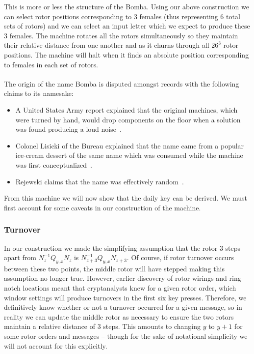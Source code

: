 \noindent This is more or less the structure of the Bomba. Using our
above construction we can select rotor positions corresponding to 3
females (thus representing 6 total sets of rotors) and we can select
an input letter which we expect to produce these 3 females. The
machine rotates all the rotors simultaneously so they maintain their
relative distance from one another and as it churns through all
$26^3$ rotor positions. The machine will halt when it finds an
absolute position corresponding to females in each set of rotors.
\\\\The
origin of the name Bomba is disputed amongst records with the
following claims to its namesake:
\begin{itemize}
  \item A United States Army report explained that the original
    machines, which were turned by hand, would drop components on the
    floor when a solution was found producing a loud noise~\cite[p.~10]{usBombeReport1944}.
  \item Colonel Lisicki of the Bureau explained that
    the name came from a popular ice-cream dessert of the same name
    which was consumed while the machine was first conceptualized~\cite[p.~63]{KozaczukEnigma1984}.
  \item Rejewski claims that the name was effectively random~\cite[p.~226]{Rejewski1981}.
\end{itemize}
From this machine we will now show that the daily key can be derived.
We must first account for some caveats in our construction of the machine.

\subsubsection{Turnover}
In our construction we made the simplifying assumption that the rotor
3 steps apart from $N_{z}^{-1}Q_{y,x}N_{z}$ is
$N_{z+3}^{-1}Q_{y,x}N_{z+3}$. Of course, if rotor turnover occurs
between these two points, the middle rotor will have stepped making
this assumption no longer true. However, earlier discovery of rotor
wirings and ring notch locations meant that cryptanalysts knew for a
given rotor order, which window settings will produce turnovers in
the first six key presses. Therefore, we definitively know whether or
not a turnover occurred for a given message, so in reality we can
update the middle rotor as necessary to ensure the two rotors
maintain a relative distance of 3 steps. This amounts to changing $y$
to $y+1$ for some rotor orders and messages -- though for the sake of
notational simplicity we will not account for this explicitly.
